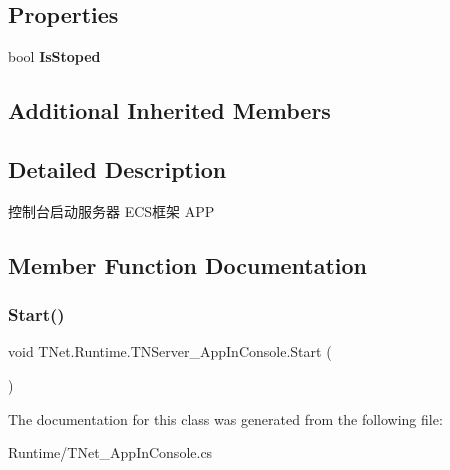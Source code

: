 \subsection*{Properties}
\begin{DoxyCompactItemize}
\item 
\mbox{\label{class_t_net_1_1_runtime_1_1_t_n_server___app_in_console_a29b5bf22c64008c5ecc60998586ad6aa}} 
bool {\bfseries Is\+Stoped}
\end{DoxyCompactItemize}
\subsection*{Additional Inherited Members}


\subsection{Detailed Description}
控制台启动服务器 E\+C\+S框架 A\+PP 



\subsection{Member Function Documentation}
\mbox{\label{class_t_net_1_1_runtime_1_1_t_n_server___app_in_console_aac219c9a301d5201e81c30caf6945eb0}} 
\subsubsection{\texorpdfstring{Start()}{Start()}}
{\footnotesize\ttfamily void T\+Net.\+Runtime.\+T\+N\+Server\+\_\+\+App\+In\+Console.\+Start (\begin{DoxyParamCaption}{ }\end{DoxyParamCaption})}







The documentation for this class was generated from the following file\+:\begin{DoxyCompactItemize}
\item 
Runtime/T\+Net\+\_\+\+App\+In\+Console.\+cs\end{DoxyCompactItemize}
